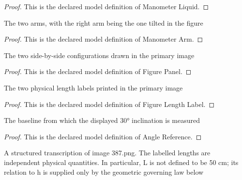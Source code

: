 \begin{proof}
  This is the declared model definition of Manometer Liquid.
\end{proof}
\begin{definition}
  \label{def:physics:phyx-mini-0387:phyxminiproblems-problemphyxmini0387-manometerarm}
  The two arms, with the right arm being the one tilted in the figure
\end{definition}
\begin{proof}
  This is the declared model definition of Manometer Arm.
\end{proof}
\begin{definition}
  \label{def:physics:phyx-mini-0387:phyxminiproblems-problemphyxmini0387-figurepanel}
  The two side-by-side configurations drawn in the primary image
\end{definition}
\begin{proof}
  This is the declared model definition of Figure Panel.
\end{proof}
\begin{definition}
  \label{def:physics:phyx-mini-0387:phyxminiproblems-problemphyxmini0387-figurelengthlabel}
  The two physical length labels printed in the primary image
\end{definition}
\begin{proof}
  This is the declared model definition of Figure Length Label.
\end{proof}
\begin{definition}
  \label{def:physics:phyx-mini-0387:phyxminiproblems-problemphyxmini0387-anglereference}
  The baseline from which the displayed 30° inclination is measured
\end{definition}
\begin{proof}
  This is the declared model definition of Angle Reference.
\end{proof}
\begin{definition}
  \label{def:physics:phyx-mini-0387:phyxminiproblems-problemphyxmini0387-suppliedmanometerfigure}
  A structured transcription of image 387.png. The labelled lengths are independent physical quantities. In particular, L is not defined to be 50 cm; its relation to h is supplied only by the geometric governing law below
\end{definition}
